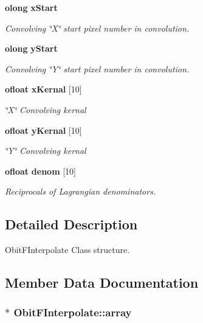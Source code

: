 \begin{CompactItemize}
{\bf olong} {\bf x\-Start}
\begin{CompactList}\small\item\em Convolving \char`\"{}X\char`\"{} start pixel number in convolution. \item\end{CompactList}\item 
{\bf olong} {\bf y\-Start}
\begin{CompactList}\small\item\em Convolving \char`\"{}Y\char`\"{} start pixel number in convolution. \item\end{CompactList}\item 
{\bf ofloat} {\bf x\-Kernal} [10]
\begin{CompactList}\small\item\em \char`\"{}X\char`\"{} Convolving kernal \item\end{CompactList}\item 
{\bf ofloat} {\bf y\-Kernal} [10]
\begin{CompactList}\small\item\em \char`\"{}Y\char`\"{} Convolving kernal \item\end{CompactList}\item 
{\bf ofloat} {\bf denom} [10]
\begin{CompactList}\small\item\em Reciprocals of Lagrangian denominators. \item\end{CompactList}\end{CompactItemize}


\subsection{Detailed Description}
Obit\-FInterpolate Class structure. 



\subsection{Member Data Documentation}
\subsubsection{$\ast$ {\bf Obit\-FInterpolate::array}}\label{structObitFInterpolate_o8}


